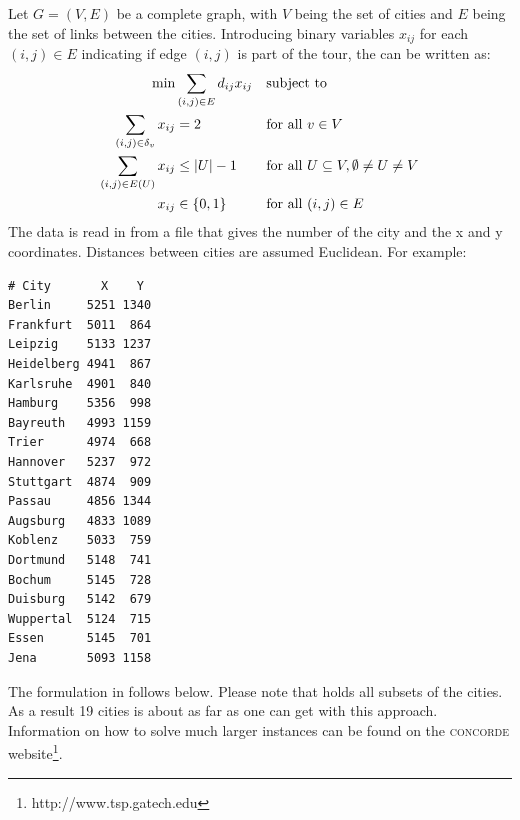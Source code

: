 Let $G=(V,E)$ be a complete graph, with $V$ being the set of cities
and $E$ being the set of links between the cities. Introducing binary
variables $x_{ij}$ for each $(i,j)\in E$ indicating if edge $(i,j)$ is
part of the tour, the \tsp can be written as:
\begin{align*}
\min &\sum_{(i,j)\in E}d_{ij} x_{ij}&&\text{subject to}\nonumber\\
\sum_{(i,j)\in\delta_v} x_{ij}&=2&&\text{for all } v\in V\nonumber\\
\sum_{(i,j)\in E(U)} x_{ij}&\leq |U|-1&&\text{for all } U\subseteq V, \emptyset\neq
U\neq V\\
x_{ij}&\in\{0,1\}&&\text{for all } (i,j)\in E\nonumber
\end{align*}
%
The data is read in from a file that gives the number of the city and the
x and y coordinates. Distances between cities are assumed Euclidean. For example:
{\footnotesize
\setlength\columnseprule{0.4pt}
\begin{multicols}{2}
\begin{verbatim}
# City       X    Y
Berlin     5251 1340
Frankfurt  5011  864
Leipzig    5133 1237
Heidelberg 4941  867
Karlsruhe  4901  840
Hamburg    5356  998
Bayreuth   4993 1159
Trier      4974  668
Hannover   5237  972
Stuttgart  4874  909
Passau     4856 1344
Augsburg   4833 1089
Koblenz    5033  759
Dortmund   5148  741
Bochum     5145  728
Duisburg   5142  679
Wuppertal  5124  715
Essen      5145  701
Jena       5093 1158
\end{verbatim}
\end{multicols}
}


\noindent The formulation in \zimpl follows below. Please note that 
holds all subsets of the cities. As a result
19 cities is about as far as one can get with this approach.
Information on how to solve much larger instances can be found on the
\textsc{concorde} website\footnote{http://www.tsp.gatech.edu}.

